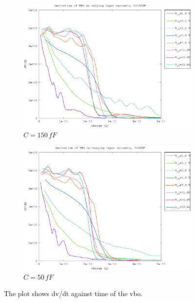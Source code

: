 \documentclass{article}
\begin{document}
\begin{figure}[h]
\begin{subfigure}[b]{0.475\textwidth}
	    \centering 
	    \includegraphics[width=\textwidth]{fig/vbo_d_slope_150fF.eps}
	    \caption[]%
	    {$C=150\,fF$}    
	    \label{fig:vbo_d_slopes_150fF}
	\end{subfigure}
	\quad
	\begin{subfigure}[b]{0.475\textwidth}   
	    \centering 
	    \includegraphics[width=\textwidth]{fig/vbo_d_slope_50fF.eps}
	    \caption[]%
	    {$C=50\,fF$}    
	    \label{fig:vbo_d_slopes_50fF}
	\end{subfigure}
	\caption{The plot shows dv/dt against time of the vbo.}
	\label{fig:vbo_d_slopes}
\end{figure}
\end{document}
